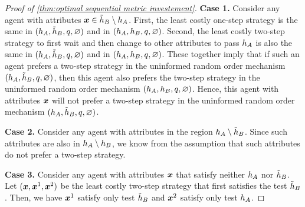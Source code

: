 \begin{proof}[Proof of \cref{thm:optimal sequential metric investement}]
    \textbf{Case 1.} Consider any agent with attributes $\boldsymbol{x} \in \tilde {h}_B \setminus h_A$.
    First, the least costly one-step strategy is the same in $(h_A,\tilde{h}_B,q,\varnothing)$ and in $(h_A,h_B,q,\varnothing)$.
    Second, the least costly two-step strategy to first wait and then change to other attributes to pass $h_A$ is also the same in $(h_A,\tilde{h}_B,q,\varnothing)$ and in $(h_A,h_B,q,\varnothing)$.
    These together imply that if such an agent 
    prefers a two-step strategy in the uninformed random order mechanism $(h_A,\tilde{h}_B,q,\varnothing)$, then this agent also prefers the two-step strategy in the uninformed random order mechanism $(h_A,h_B,q,\varnothing)$. 
    Hence, this agent with attributes $\boldsymbol{x}$ will not prefer a two-step strategy in the uninformed random order mechanism $(h_A,\tilde{h}_B,q,\varnothing)$.
    
    \textbf{Case 2.} Consider any agent with attributes in the region $h_A \setminus \tilde {h}_B$. Since such attributes are also in $h_A \setminus h_B$, we know from the assumption that such attributes do not prefer a two-step strategy.
    
    \textbf{Case 3.} Consider any agent with attributes $\boldsymbol{x}$ that  satisfy neither $h_A$ nor $\tilde {h}_B$. 
    Let $(\boldsymbol{x},\boldsymbol{x}^1,\boldsymbol{x}^2)$ be the least costly two-step strategy that first satisfies the test $\tilde {h}_B$.
    Then, we have $\boldsymbol{x}^1$ satisfy only test $\tilde {h}_B$ and $\boldsymbol{x}^2$ satisfy only test $h_A$.
    

\end{proof}

